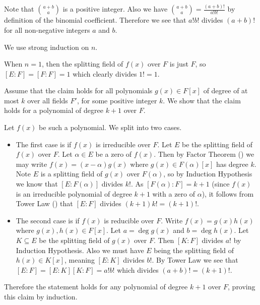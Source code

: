 \begin{questions}
    \item \begin{partquestions}{\roman*}
        \item Note that ${a+b\choose a}$ is a positive integer. Also we have ${a+b\choose a} = \frac{(a+b)!}{a!b!}$ by definition of the binomial coefficient. Therefore we see that $a!b!$ divides $(a+b)!$ for all non-negative integers $a$ and $b$.
        
        \item We use strong induction on $n$.
        
        When $n = 1$, then the splitting field of $f(x)$ over $F$ is just $F$, so $[E:F] = [F:F] = 1$ which clearly divides $1! = 1$.

        Assume that the claim holds for all polynomials $g(x) \in F[x]$ of degree of at most $k$ over all fields $F'$, for some positive integer $k$. We show that the claim holds for a polynomial of degree $k+1$ over $F$.

        Let $f(x)$ be such a polynomial. We split into two cases.
        \begin{itemize}
            \item The first case is if $f(x)$ is irreducible over $F$. Let $E$ be the splitting field of $f(x)$ over $F$. Let $\alpha \in E$ be a zero of $f(x)$. Then by Factor Theorem () we may write $f(x) = (x-\alpha)g(x)$ where $g(x) \in F(\alpha)[x]$ has degree $k$. Note $E$ is a splitting field of $g(x)$ over $F(\alpha)$, so by Induction Hypothesis we know that $[E:F(\alpha)]$ divides $k!$. As $[F(\alpha):F] = k+1$ (since $f(x)$ is an irreducible polynomial of degree $k+1$ with a zero of $\alpha$), it follows from Tower Law () that $[E:F]$ divides $(k+1)k! = (k+1)!$.
            
            \item The second case is if $f(x)$ is reducible over $F$. Write $f(x) = g(x)h(x)$ where $g(x), h(x) \in F[x]$. Let $a = \deg g(x)$ and $b = \deg h(x)$. Let $K \subseteq E$ be the splitting field of $g(x)$ over $F$. Then $[K:F]$ divides $a!$ by Induction Hypothesis. Also we must have $E$ being the splitting field of $h(x) \in K[x]$, meaning $[E:K]$ divides $b!$. By Tower Law we see that $[E:F] = [E:K][K:F] = a!b!$ which divides $(a+b)! = (k+1)!$.
        \end{itemize}
        Therefore the statement holds for any polynomial of degree $k+1$ over $F$, proving this claim by induction.
    \end{partquestions}
\end{questions}
